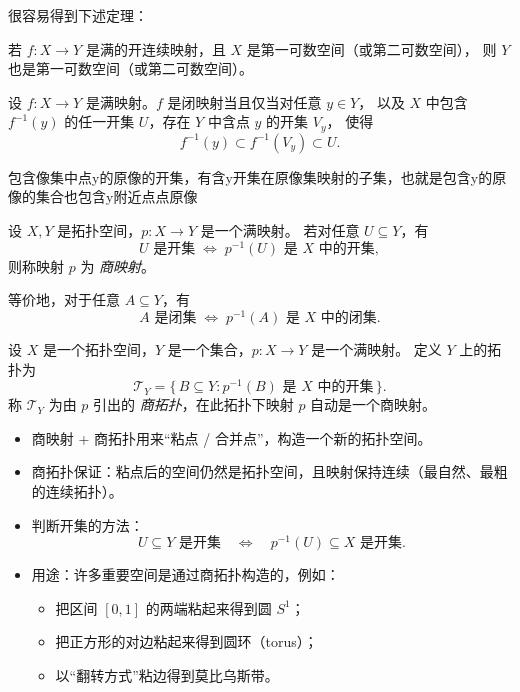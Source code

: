 很容易得到下述定理：

\begin{theorem}[满+开+连续保持可数性]
若 $f : X \to Y$ 是满的开连续映射，且 $X$ 是第一可数空间（或第二可数空间），
则 $Y$ 也是第一可数空间（或第二可数空间）。
\end{theorem}
\begin{theorem}[满映射+?=闭映射]
设 $f : X \to Y$ 是满映射。$f$ 是闭映射当且仅当对任意 $y \in Y$，
以及 $X$ 中包含 $f^{-1}(y)$ 的任一开集 $U$，存在 $Y$ 中含点 $y$ 的开集 $V_y$，
使得
\[
f^{-1}(y) \subset f^{-1}(V_y) \subset U.
\]
\end{theorem}
\begin{note}
    包含像集中点y的原像的开集，有含y开集在原像集映射的子集，也就是包含y的原像的集合也包含y附近点点原像
\end{note}
\begin{definition}
设 $X, Y$ 是拓扑空间，$p : X \to Y$ 是一个满映射。
若对任意 $U \subseteq Y$，有
\[
U \text{ 是开集} \;\Longleftrightarrow\; p^{-1}(U) \text{ 是 } X \text{ 中的开集},
\]
则称映射 $p$ 为 \emph{商映射}。

等价地，对于任意 $A \subseteq Y$，有
\[
A \text{ 是闭集} \;\Longleftrightarrow\; p^{-1}(A) \text{ 是 } X \text{ 中的闭集}.
\]
\end{definition}
\begin{definition}
设 $X$ 是一个拓扑空间，$Y$ 是一个集合，$p : X \to Y$ 是一个满映射。
定义 $Y$ 上的拓扑为
\[
\mathcal{T}_Y = \{\, B \subseteq Y : p^{-1}(B) \text{ 是 } X \text{ 中的开集} \,\}.
\]
称 $\mathcal{T}_Y$ 为由 $p$ 引出的 \emph{商拓扑}，在此拓扑下映射 $p$ 自动是一个商映射。
\end{definition}
\begin{note}
    \begin{itemize}
    \item 商映射 + 商拓扑用来“粘点 / 合并点”，构造一个新的拓扑空间。
    \item 商拓扑保证：粘点后的空间仍然是拓扑空间，且映射保持连续（最自然、最粗的连续拓扑）。
    \item 判断开集的方法：
    \[
        U \subseteq Y \text{ 是开集} \quad \Longleftrightarrow \quad p^{-1}(U) \subseteq X \text{ 是开集}.
    \]
    \item 用途：许多重要空间是通过商拓扑构造的，例如：
        \begin{itemize}
            \item 把区间 $[0,1]$ 的两端粘起来得到圆 $S^1$；
            \item 把正方形的对边粘起来得到圆环（torus）；
            \item 以“翻转方式”粘边得到莫比乌斯带。
        \end{itemize}
\end{itemize}
\end{note}
